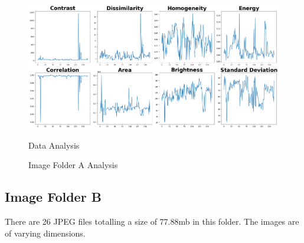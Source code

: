 \begin{figure}[ht]
\begin{minipage}[t]{0.50\textwidth}
        \centering
        \includegraphics[width=\textwidth]{Figures/EDA_Charts/2/da.png}
        \caption*{Data Analysis}
    \end{minipage}
    \caption{Image Folder A Analysis}
    \label{fig:Image Folder A Analysis}
\end{figure}


\subsection{Image Folder B}

There are 26 JPEG files totalling a size of 77.88mb in this folder. The images are of varying dimensions.

